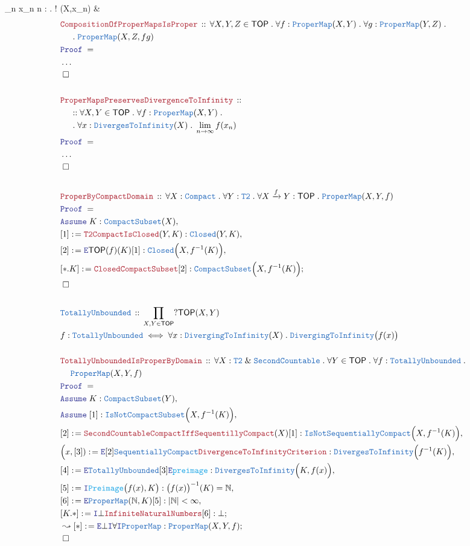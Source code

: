 \documentclass[12pt]{scrartcl}
\newcommand{\TYPE}[1]{\textcolor{NavyBlue}{\mathtt{#1}}}
\newcommand{\FUNC}[1]{\textcolor{Cerulean}{\mathtt{#1}}}
\newcommand{\LOGIC}[1]{\textcolor{Blue}{\mathtt{#1}}}
\newcommand{\THM}[1]{\textcolor{Maroon}{\mathtt{#1}}}
\renewcommand{\.}{\; . \;}
\newcommand{\de}{: \kern 0.1pc =}
\newcommand{\IsNot}{\; ! \;}
\newcommand{\Theorem}[2]{& \THM{#1} \, :: \, #2 \\ & \Proof = \\ }
\newcommand{\DeclareType}[2]{& \TYPE{#1} \, :: \, #2 \\}
\newcommand{\DefineType}[3]{& #1 : \TYPE{#2} \iff #3 \\}
\newcommand{\NewLine}{\\ & \kern 1pc}
\newcommand{\Page}[1]{ \begin{align*} #1 \end{align*}   }
\newcommand{\NoProof}{ & \ldots \\ \EndProof}
\renewcommand{\And}{\; \& \;}
\newcommand{\Intro}{\LOGIC{I}}
\newcommand{\Elim}{\LOGIC{E}}
\newcommand{\Nat}{\mathbb{N} }
\newcommand{\Arrow}{\xrightarrow}
\newcommand{\Say}[3]{& #1 \de #2 : #3, \\}
\newcommand{\Conclude}[3]{& #1 \de #2 : #3; \\}
\newcommand{\DeriveConclude}[3]{& \leadsto #1 \de #2 : #3 ; \\}
\newcommand{\Assume}[2]{& \LOGIC{Assume} \; #1 : #2, \\}
\newcommand{\QED}{\; \square}
\newcommand{\EndProof}{& \QED \\}
\newcommand{\Proof}{\LOGIC{Proof} \; }
\newcommand{\TOP}{\mathsf{TOP}}
\begin{document}
{	{
		\lim_{n \to \infty} x_n 
		\iff
		\forall n : \Nat \uparrow \Nat \.
		\IsNot \TYPE{Convergent}(X,x_n)	
	}
	\EndProof
}\Page{
	\Theorem{CompositionOfProperMapsIsProper}
	{
		\forall X,Y,Z \in \TOP \.
		\forall f:\TYPE{ProperMap}(X,Y) \.
		\forall g : \TYPE{ProperMap}(Y,Z) \. \NewLine \. 
		\TYPE{ProperMap}(X,Z,fg)
	}
	\NoProof
	\\
	\Theorem{ProperMapsPreservesDivergenceToInfinity}
	{
		\NewLine ::
		\forall X,Y \in \TOP \.
		\forall f : \TYPE{ProperMap}(X,Y) \. \NewLine \. 
		\forall x : \TYPE{DivergesToInfinity}(X) \. \lim_{n \to \infty} f(x_n) 
	}
	\NoProof
	\\
	\Theorem{ProperByCompactDomain}
	{
		\forall X : \TYPE{Compact} \.
		\forall Y : \TYPE{T2} \.
		\forall X \Arrow{f} Y : \TOP \.
		\TYPE{ProperMap}(X,Y,f)
	}
	\Assume{K}{\TYPE{CompactSubset}(X)}
	\Say{[1]}{\THM{T2CompactIsClosed}(Y,K)}{ \TYPE{Closed}(Y,K)  }
	\Say{[2]}{\Elim \TOP(f)(K)[1]}{\TYPE{Closed}\Big( X, f^{-1}(K) \Big)}
	\Conclude{[*.K]}{\THM{ClosedCompactSubset}[2]}{\TYPE{CompactSubset}\Big( X, f^{-1}(K) \Big)}
	\EndProof
	\\
	\DeclareType{TotallyUnbounded}
	{
		\prod_{X,Y \in \TOP} ?\TOP(X,Y)
	}
	\DefineType{f}{TotallyUnbounded}{\forall x : \TYPE{DivergingToInfinity}(X) \. \TYPE{DivergingToInfinity}\big(f(x)\big)  }
	\\
	\Theorem{TotallyUnboundedIsProperByDomain}
	{
		\forall X : \TYPE{T2} \And \TYPE{SecondCountable} \.
		\forall Y \in \TOP \.
		\forall f : \TYPE{TotallyUnbounded} \. \NewLine
		\TYPE{ProperMap}(X,Y,f)
	}
	\Assume{K}{\TYPE{CompactSubset}(Y)}
	\Assume{[1]}{\TYPE{IsNot} \TYPE{CompactSubset}\Big(X,f^{-1}(K) \Big)}
	\Say{[2]}{\THM{SecondCountableCompactIffSequentillyCompact}(X)[1]}
	{
		\TYPE{IsNot} \TYPE{SequentiallyCompact}\Big( X, f^{-1}(K) \Big)
	}
	\Say{\Big(x,[3])}{\Elim[2]\TYPE{SequentiallyCompact}\THM{DivergenceToInfinityCriterion}}
	{\TYPE{DivergesToInfinity}\Big(f^{-1}(K)\Big)}
	\Say{[4]}{\Elim\TYPE{TotallyUnbounded}[3]\Elim \FUNC{preimage}}
	{\TYPE{DivergesToInfinity}\Big(K,f(x)\Big)}
	\Say{[5]}{\Intro \FUNC{Preimage}\big(f(x), K\big)}{ \big( f(x) \big)^{-1}(K) = \Nat}
	\Say{[6]}{\Elim \TYPE{ProperMap}(\Nat, K)[5]}{|\Nat| < \infty}
	\Conclude{[K.*]}{\Intro \bot\THM{InfiniteNaturalNumbers}[6]}{\bot}
	\DeriveConclude{[*]}{\Elim \bot \Intro \forall \Intro \TYPE{ProperMap} }
	{
		\TYPE{ProperMap}(X,Y,f)
	}
	\EndProof
}
\end{document}
